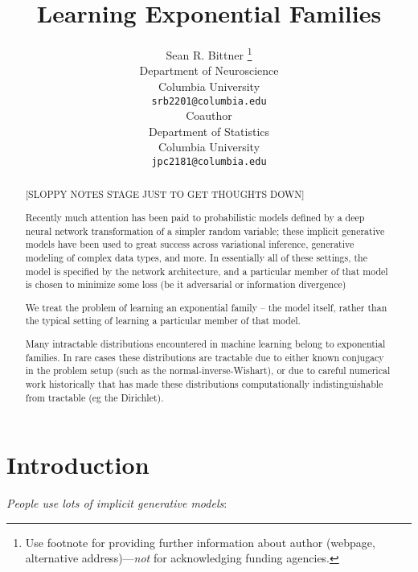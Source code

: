 \documentclass{article}
\title{Learning Exponential Families}
\author{
  Sean R. Bittner \thanks{Use footnote for providing further
    information about author (webpage, alternative
    address)---\emph{not} for acknowledging funding agencies.} \\
  Department of Neuroscience\\
  Columbia University\\
  \texttt{srb2201@columbia.edu} \\
 \And
Coauthor \\
Department of Statistics\\
  Columbia University\\
 \texttt{jpc2181@columbia.edu} \\
}
\begin{document}

\maketitle

\begin{abstract}
  
  [SLOPPY NOTES STAGE JUST TO GET THOUGHTS DOWN]
  
Recently much attention has been paid to probabilistic models defined by a deep neural network transformation of a simpler random variable; these implicit generative models have been used to great success across variational inference, generative modeling of complex data types, and more.  In essentially all of these settings, the model is specified by the network architecture, and a particular member of that model is chosen to minimize some loss (be it adversarial or information divergence)
  
  We treat the problem of learning an exponential family -- the model itself, rather than the typical setting of learning a particular member of that model.
  
Many intractable distributions encountered in machine learning belong to exponential families.  In rare cases these distributions are tractable due to either known conjugacy in the problem setup (such as the normal-inverse-Wishart), or due to careful numerical work historically that has made these distributions computationally indistinguishable from tractable (eg the Dirichlet).
  
\end{abstract}

\section{Introduction}

  \emph{People use lots of implicit generative models}:
  
\end{document}

